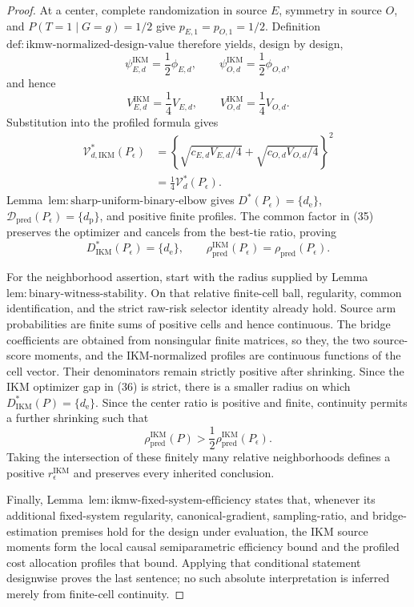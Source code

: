 \documentclass{article}
\begin{document}
\begin{proof}
At a center, complete randomization in source \(E\), symmetry in source \(O\), and \(P(T=1\mid G=g)=1/2\) give \(p_{E,1}=p_{O,1}=1/2\).  Definition~\(\mathrm{def{:}ikmw\text{-}normalized\text{-}design\text{-}value}\) therefore yields, design by design,
\[
 \psi_{E,d}^{\mathrm{IKM}}=\frac12\phi_{E,d},
 \qquad
 \psi_{O,d}^{\mathrm{IKM}}=\frac12\phi_{O,d},
\]
and hence
\[
 V_{E,d}^{\mathrm{IKM}}=\frac14V_{E,d},
 \qquad
 V_{O,d}^{\mathrm{IKM}}=\frac14V_{O,d}.
\]
Substitution into the profiled formula gives
\[
\begin{aligned}
 \mathcal V_{d,\mathrm{IKM}}^*(P_\epsilon)
 &=\left\{
 \sqrt{c_{E,d}V_{E,d}/4}+\sqrt{c_{O,d}V_{O,d}/4}
 \right\}^2\\
 &=\frac14\mathcal V_d^*(P_\epsilon).                    \tag{35}
\end{aligned}
\]
Lemma~\(\mathrm{lem{:}sharp\text{-}uniform\text{-}binary\text{-}elbow}\) gives \(D^*(P_\epsilon)=\{d_{\mathrm e}\}\), \(\mathcal D_{\mathrm{pred}}(P_\epsilon)=\{d_{\mathrm p}\}\), and positive finite profiles.  The common factor in (35) preserves the optimizer and cancels from the best-tie ratio, proving
\[
 D_{\mathrm{IKM}}^*(P_\epsilon)=\{d_{\mathrm e}\},
 \qquad
 \rho_{\mathrm{pred}}^{\mathrm{IKM}}(P_\epsilon)
 =\rho_{\mathrm{pred}}(P_\epsilon).                       \tag{36}
\]

For the neighborhood assertion, start with the radius supplied by Lemma~\(\mathrm{lem{:}binary\text{-}witness\text{-}stability}\).  On that relative finite-cell ball, regularity, common identification, and the strict raw-risk selector identity already hold.  Source arm probabilities are finite sums of positive cells and hence continuous.  The bridge coefficients are obtained from nonsingular finite matrices, so they, the two source-score moments, and the IKM-normalized profiles are continuous functions of the cell vector.  Their denominators remain strictly positive after shrinking.  Since the IKM optimizer gap in (36) is strict, there is a smaller radius on which \(D_{\mathrm{IKM}}^*(P)=\{d_{\mathrm e}\}\).  Since the center ratio is positive and finite, continuity permits a further shrinking such that
\[
 \rho_{\mathrm{pred}}^{\mathrm{IKM}}(P)
 >\frac12\rho_{\mathrm{pred}}^{\mathrm{IKM}}(P_\epsilon).
\]
Taking the intersection of these finitely many relative neighborhoods defines a positive \(r_\epsilon^{\mathrm{IKM}}\) and preserves every inherited conclusion.

Finally, Lemma~\(\mathrm{lem{:}ikmw\text{-}fixed\text{-}system\text{-}efficiency}\) states that, whenever its additional fixed-system regularity, canonical-gradient, sampling-ratio, and bridge-estimation premises hold for the design under evaluation, the IKM source moments form the local causal semiparametric efficiency bound and the profiled cost allocation profiles that bound.  Applying that conditional statement designwise proves the last sentence; no such absolute interpretation is inferred merely from finite-cell continuity.
\end{proof}
\end{document}
